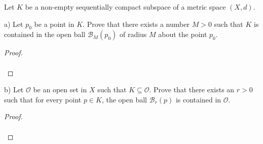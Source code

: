 Let $K$ be a non-empty sequentially compact subspace of a metric space $(X, d)$.

a) Let $p_0$ be a point in $K$. Prove that there exists a number $M > 0$ such that $K$ is contained in the open ball
   $\mathcal{B}_M(p_0)$ of radius $M$ about the point $p_0$. 

\begin{proof}\renewcommand{\qedsymbol}{}\ \\\\
\end{proof}

\pagebreak

b) Let $\mathcal{O}$ be an open set in $X$ such that $K \subseteq \mathcal{O}$. Prove that there exists an $r > 0$ such
   that for every point $p \in K$, the open ball $\mathcal{B}_r(p)$ is contained in $\mathcal{O}$.

\begin{proof}\renewcommand{\qedsymbol}{}\ \\\\
\end{proof}

\pagebreak